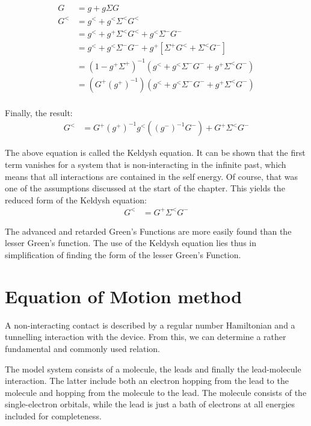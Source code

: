 \begin{align*}
G &= g + g\Sigma G \\
G^< &= g^<  + g^< \Sigma^< G^< \\
 &= g^<  + g^+ \Sigma^< G^< + g^< \Sigma^- G^- \\
 &= g^<  + g^< \Sigma^- G^- + g^+ \left[ \Sigma^+ G^< + \Sigma^< G^- \right]\\
 &= (1 - g^+ \Sigma^+)^{-1} \left( g^<  + g^< \Sigma^- G^- + g^+ \Sigma^< G^-\right) \\
 &= \left(G^+ (g^+)^{-1}\right)\left( g^<  + g^< \Sigma^- G^- + g^+ \Sigma^< G^-\right) \\ 
\end{align*}

Finally, the result:
\begin{align}
G^< &= G^+ (g^+)^{-1} g^< \left((g^-)^{-1}G^-  \right) + G^+  \Sigma^< G^- \label{eq:keldysh}
\end{align}

The above equation is called the Keldysh equation. It can be shown that the first term vanishes for a system that is non-interacting in the infinite past, which means that all interactions are contained in the self energy. Of course, that was one of the assumptions discussed at the start of the chapter. This yields the reduced form of the Keldysh equation:
\begin{align*}
G^< &=  G^+ \Sigma^< G^- 
\end{align*}

The advanced and retarded Green's Functions are more easily found than the lesser Green's function. The use of the Keldysh equation lies thus in simplification of finding the form of the lesser Green's Function.

\section{Equation of Motion method}
\label{sec:eommethod}
A non-interacting contact is described by a regular number Hamiltonian and a tunnelling interaction with the device. From this, we can determine a rather fundamental and commonly used relation. 

The model system consists of a molecule, the leads and finally the lead-molecule interaction. The latter include both an electron hopping from the lead to the molecule and hopping from the molecule to the lead. The molecule consists of the single-electron orbitals, while the lead is just a bath of electrons at all energies included for completeness.

